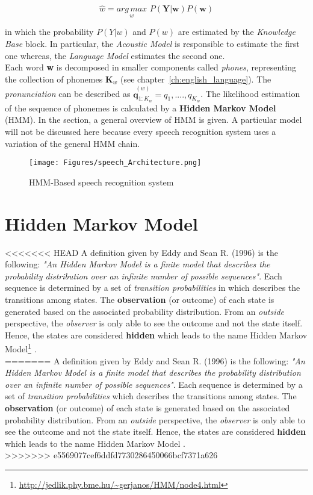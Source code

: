\begin{equation}
	\widehat{w} = \underset{w}{arg \, max} \,\, P (\textbf{Y}|\textbf{w}) P(\textbf{w})
\end{equation}

\noindent in which the probability $P(Y|w)$ and $P(w)$ are estimated by the \textit{Knowledge Base} block. In particular, the \textit{Acoustic Model} is responsible to estimate the first one whereas, the \textit{Language Model} estimates the second one. \\
\noindent Each word \textbf{w} is decomposed in smaller components called \textit{phones}, representing the collection of phonemes $\textbf{K}_{w}$ (see chapter~\ref{ch:english_language}). The \textit{pronunciation} can be described as $\overset{(w)}{\textbf{q}_{1:K_{w}}} = q_{1}, ...., q_{K_{w}}$. The likelihood estimation of the sequence of phonemes is calculated by a \textbf{Hidden Markov Model} (HMM). In the section, a general overview of HMM is given. A particular model will not be discussed here because every speech recognition system uses a variation of the general HMM chain. \\

\begin{figure}[!ht]
	\centering
	\texttt{[image: Figures/speech\_Architecture.png]}
	\caption{HMM-Based speech recognition system \cite{gales2008application}}
	\label{fig:speech_architecture}
\end{figure}

\section{Hidden Markov Model}
\label{sec:hmm}
<<<<<<< HEAD
\noindent A definition given by Eddy and Sean R. (1996) is the following: \textit{"An Hidden Markov Model is a finite model that describes the probability distribution over an infinite number of possible sequences"}. Each sequence is determined by a set of \textit{transition probabilities} in which describes the transitions among states. The \textbf{observation} (or outcome) of each state is generated based on the associated probability distribution. From an \textit{outside} perspective, the \textit{observer} is only able to see the outcome and not the state itself. Hence, the states are considered \textbf{hidden} which leads to the name Hidden Markov Model\footnote{\url{http://jedlik.phy.bme.hu/~gerjanos/HMM/node4.html}} \cite{rabiner1986introduction}. \\
=======
\noindent A definition given by Eddy and Sean R. (1996) is the following: \textit{"An Hidden Markov Model is a finite model that describes the probability distribution over an infinite number of possible sequences"}. Each sequence is determined by a set of \textit{transition probabilities} which describes the transitions among states. The \textbf{observation} (or outcome) of each state is generated based on the associated probability distribution. From an \textit{outside} perspective, the \textit{observer} is only able to see the outcome and not the state itself. Hence, the states are considered \textbf{hidden} which leads to the name Hidden Markov Model \cite{def_hmm}. \\
>>>>>>> e5569077cef6ddfd7730286450066bcf7371a626

